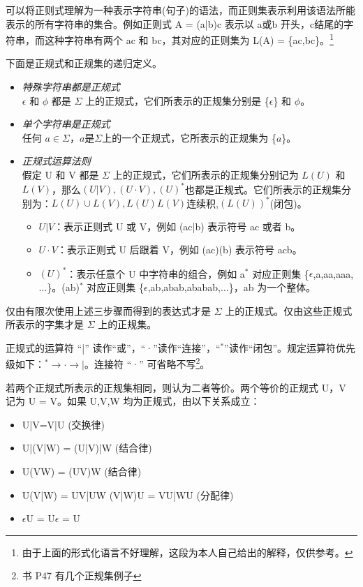可以将正则式理解为一种表示字符串(句子)的语法，而正则集表示利用该语法所能表示的所有字符串的集合。例如正则式 A = (a|b)c 表示以 a或b 开头，c结尾的字符串，而这种字符串有两个 ac 和 bc，其对应的正则集为  L(A) = \{ac,bc\}。\footnote{由于上面的形式化语言不好理解，这段为本人自己给出的解释，仅供参考。}

下面是正规式和正规集的递归定义。

\begin{itemize}
    \item \textit{特殊字符串都是正规式} \\
    $\epsilon$ 和 $\phi$ 都是 $\Sigma$ 上的正规式，它们所表示的正规集分别是 \{$\epsilon$\} 和 $\phi$。
    \item \textit{单个字符串是正规式 }\\
    任何 $a\in\Sigma$，$a$是$\Sigma$上的一个正规式，它所表示的正规集为 \{$a$\}。
    \item \textit{正规式运算法则}\\
    假定 U 和 V 都是 $\Sigma$ 上的正规式，它们所表示的正规集分别记为 $L(U)$ 和 $L(V)$，那么$(U|V),(U \cdot V),(U)^{*}$也都是正规式。它们所表示的正规集分别为：$L(U)\cup L(V),L(U) L(V)$连续积,$(L(U))^{*}$(闭包)。
    \begin{itemize}
        \item $U|V$：表示正则式 U 或 V，例如 (ac|b) 表示符号 ac 或者 b。
        \item $U \cdot V$：表示正则式 U 后跟着 V，例如 (ac)(b) 表示符号 acb。
        \item $(U)^{*}$：表示任意个 U 中字符串的组合，例如 a$^{*}$ 对应正则集 \{$\epsilon$,a,aa,aaa,$\dots$\}。(ab)$^{*}$ 对应正则集 \{$\epsilon$,ab,abab,ababab,$\dots$\}，ab 为一个整体。
    \end{itemize}
\end{itemize}

仅由有限次使用上述三步骤而得到的表达式才是 $\Sigma$ 上的正规式。仅由这些正规式所表示的字集才是 $\Sigma$ 上的正规集。

正规式的运算符 ``|'' 读作``或''，``·''读作``连接''，``$^{*}$''读作``闭包''。规定运算符优先级如下：\textcolor{imp}{$^{*} \rightarrow \text{·} \rightarrow |$}。连接符 ``·'' 可省略不写\footnote{书 P47 有几个正规集例子}。 

若两个正规式所表示的正规集相同，则认为二者等价。两个等价的正规式 U，V 记为 U = V。如果 U,V,W 均为正规式，由以下关系成立：

\begin{itemize}
    \item \textcolor{imp}{U|V=V|U} \hfill (交换律)
    \item \textcolor{imp}{U|(V|W) = (U|V)|W} \hfill (结合律)
    \item \textcolor{imp}{U(VW) = (UV)W} \hfill (结合律)
    \item \textcolor{imp}{U(V|W) = UV|UW \quad (V|W)U = VU|WU}  \hfill (分配律)
    \item \textcolor{imp}{$\epsilon$U = U$\epsilon$ = U}
\end{itemize}

